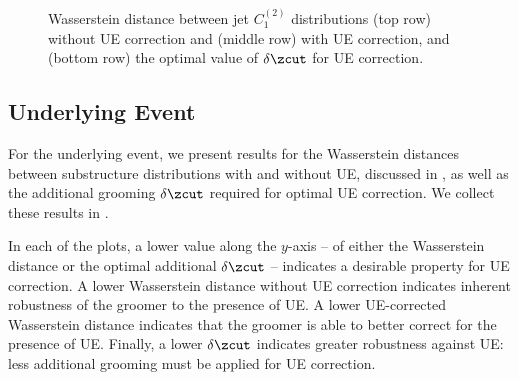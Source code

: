 \documentclass[letterpaper,11pt]{article}
\begin{document}
\begin{figure}[p]
    \centering
    \\
    \\
\caption{
    Wasserstein distance between jet \(C_1^{(2)}\) distributions (top row) without UE correction and (middle row) with UE correction, and (bottom row) the optimal value of \(\delta \zcut\) for UE correction.
}
\label{fig:uefrenzy}
\end{figure}


\subsection{Underlying Event}
\label{app:uefrenzy}

For the underlying event, we present results for the Wasserstein distances between substructure distributions with and without UE, discussed in , as well as the additional grooming \(\delta\zcut\) required for optimal UE correction.
%
We collect these results in .

In each of the plots, a lower value along the $y$-axis -- of either the Wasserstein distance or the optimal additional \(\delta\zcut\) -- indicates a desirable property for UE correction.
%
A lower Wasserstein distance without UE correction indicates inherent robustness of the groomer to the presence of UE.
%
A lower UE-corrected Wasserstein distance indicates that the groomer is able to better correct for the presence of UE.
%
Finally, a lower \(\delta\zcut\) indicates greater robustness against UE:
%
less additional grooming must be applied for UE correction.
\end{document}
